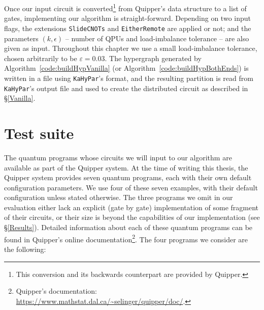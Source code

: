 Once our input circuit is converted\footnote{This conversion and its backwards counterpart are provided by Quipper.} from Quipper's data structure to a list of gates, implementing our algorithm is straight-forward. Depending on two input flags, the extensions \texttt{SlideCNOTs} and \texttt{EitherRemote} are applied or not; and the parameters \((k,\epsilon)\) -- number of QPUs and load-imbalance tolerance -- are also given as input. Throughout this chapter we use a small load-imbalance tolerance, chosen arbitrarily to be \(\varepsilon = 0.03\). The hypergraph generated by Algorithm~\ref{code:buildHypVanilla} (or Algorithm~\ref{code:buildHypBothEnds}) is written in a file using \texttt{KaHyPar}'s format, and the resulting partition is read from \texttt{KaHyPar}'s output file and used to create the distributed circuit as described in \S\ref{Vanilla}.


\section{Test suite}
\label{benchmark}

The quantum programs whose circuits we will input to our algorithm are available as part of the Quipper system. At the time of writing this thesis, the Quipper system provides seven quantum programs, each with their own default configuration parameters. We use four of these seven examples, with their default configuration unless stated otherwise. The three programs we omit in our evaluation either lack an explicit (gate by gate) implementation of some fragment of their circuits, or their size is beyond the capabilities of our implementation (see \S\ref{Results}). Detailed information about each of these quantum programs can be found in Quipper's online documentation\footnote{Quipper's documentation: \url{https://www.mathstat.dal.ca/~selinger/quipper/doc/}.}. The four programs we consider are the following:

